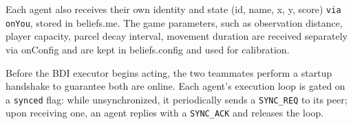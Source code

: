 Each agent also receives their own identity and state (id, name, x, y, score) \texttt{via onYou}, stored in beliefs.me.
The game parameters, such as observation distance, player capacity, parcel decay interval,
movement duration are received separately via onConfig and are kept in beliefs.config and used for calibration.

Before the BDI executor begins acting, the two teammates perform a startup handshake to guarantee
both are online. Each agent's execution loop is gated on a \texttt{synced} flag: while unsynchronized,
it periodically sends a \texttt{SYNC\_REQ} to its peer; upon receiving one, an agent replies with a
\texttt{SYNC\_ACK} and releases the loop.